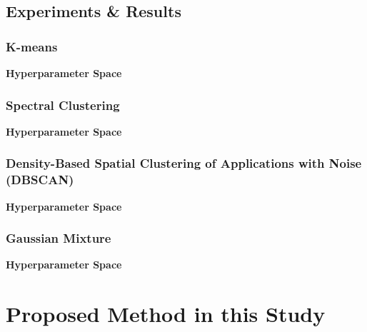 \documentclass[conference]{IEEEtran}
\begin{document}
\subsection{Experiments \& Results}


\subsubsection{K-means}


\textbf{Hyperparameter Space}




\subsubsection{Spectral Clustering}


\textbf{Hyperparameter Space}




\subsubsection{Density-Based Spatial Clustering of Applications with Noise (DBSCAN)}


\textbf{Hyperparameter Space}



\subsubsection{Gaussian Mixture}


\textbf{Hyperparameter Space}


\section{Proposed Method in this Study}
\end{document}
